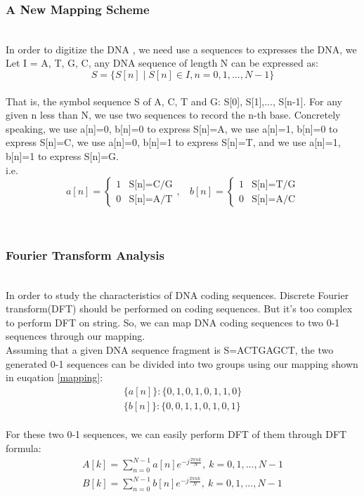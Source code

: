 \documentclass[conference]{IEEEtran}
\begin{document}
\subsubsection{A New Mapping Scheme}
~\\\indent In order to digitize the DNA , we need use a sequences to expresses the DNA, we Let I = {A, T, G, C}, any DNA sequence of length N can be expressed as:
\begin{equation}
    S=\{S[n]\mid S[n]\in I, n=0,1,...,N-1\}
\end{equation}
~\\\indent That is, the symbol sequence S of A, C, T and G: S[0], S[1],..., S[n-1]. For any given n less than N, we use two sequences to record the n-th base. Concretely speaking, we use a[n]=0, b[n]=0 to express S[n]=A, we use a[n]=1, b[n]=0 to express S[n]=C, we use a[n]=0, b[n]=1 to express S[n]=T, and we use a[n]=1, b[n]=1 to express S[n]=G.\\
i.e.
\begin{equation}\label{mapping}
    a[n]=\begin{cases}
    1& \text{S[n]=C/G}\\
    0& \text{S[n]=A/T}
    \end{cases},\ \ \ \ 
    b[n]=\begin{cases}
    1& \text{S[n]=T/G}\\
    0& \text{S[n]=A/C}
    \end{cases}
\end{equation}

~\\
\subsubsection{Fourier Transform Analysis}
~\\\indent In order to study the characteristics of DNA coding sequences. Discrete Fourier transform(DFT) should be performed on coding sequences. But it's too complex to perform DFT on string. So, we can map DNA coding sequences to two 0-1 sequences through our mapping.
~\\ \indent Assuming that a given DNA sequence fragment is S=ACTGAGCT, the two generated 0-1 sequences can be divided into two groups using our mapping shown in euqation \ref{mapping}:
$$\begin{aligned}\{a[n]\}:\{0,1,0,1,0,1,1,0\} \\
\{b[n]\}:\{0,0,1,1,0,1,0,1\}
\end{aligned}$$ 
~\\ \indent For these two 0-1 sequences, we can easily  perform DFT of them through DFT formula:
\begin{equation}\label{DFT-formula}
    \begin{aligned} A[k]=\sum_{n=0}^{N-1}{a[n]e^{-j\frac{2\pi nk}{N}}},\ k=0,1,...,N-1\\
B[k]=\sum_{n=0}^{N-1}{b[n]e^{-j\frac{2\pi nk}{N}}},\ k=0,1,...,N-1
\end{aligned}
\end{equation}
~\\
\end{document}

